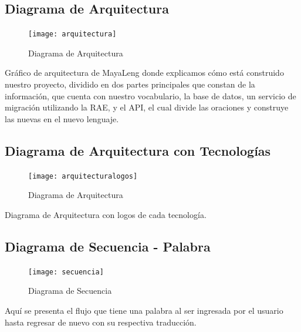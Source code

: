\documentclass[a4paper,openright,11pt]{article}
\begin{document}
\subsection{Diagrama de Arquitectura}
\begin{figure}[h]
	\centering
	\texttt{[image: arquitectura]}
	\caption{Diagrama de Arquitectura}
	\label{fig:arq}
\end{figure}

\newpage
Gráfico de arquitectura de MayaLeng donde explicamos cómo está construido nuestro proyecto, dividido en dos partes principales que constan de la información, que cuenta con nuestro vocabulario, la base de datos, un servicio de migración utilizando la RAE, y el API, el cual divide las oraciones y construye las nuevas en el nuevo lenguaje.

\subsection{Diagrama de Arquitectura con Tecnologías}
\begin{figure}[H]
	\centering
	\texttt{[image: arquitecturalogos]}
	\caption{Diagrama de Arquitectura} 
	\label{fig:arqL}
\end{figure}
Diagrama de Arquitectura con logos de cada tecnología.

\subsection{Diagrama de Secuencia - Palabra}
\begin{figure}[h]
	\centering
	\texttt{[image: secuencia]}
	\caption{Diagrama de Secuencia}
	\label{fig:sec}
\end{figure}
Aquí se presenta el flujo que tiene una palabra al ser ingresada por el usuario hasta regresar de nuevo con su respectiva traducción.
\end{document}
